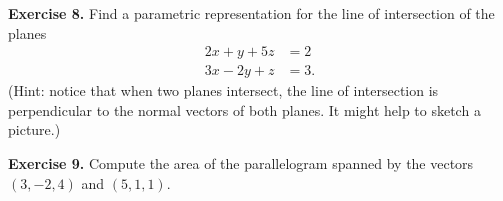 \documentclass{article}
\begin{document}
\textbf{Exercise 8.} Find a parametric representation for the
line of intersection of the planes 
\begin{align*}
    2x + y + 5z &= 2\\
    3x - 2y + z &= 3.
\end{align*}
(Hint: notice that when two planes intersect, the line of intersection is perpendicular to
the normal vectors of both planes. It might help to sketch a picture.)

\textbf{Exercise 9.} Compute the area of the parallelogram spanned
by the vectors $(3,-2,4)$ and $(5,1,1)$.

\end{document}
